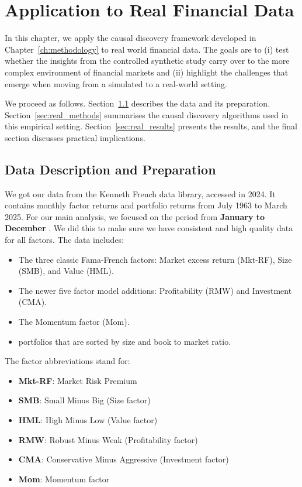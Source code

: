 \chapter{Application to Real Financial Data}
\label{ch:realdata}

In this chapter, we apply the causal discovery framework developed in Chapter~\ref{ch:methodology} to real world financial data. The goals are to (i) test whether the insights from the controlled synthetic study carry over to the more complex environment of financial markets and (ii) highlight the challenges that emerge when moving from a simulated to a real-world setting.

We proceed as follows. Section~\ref{sec:real_data_description} describes the data and its preparation. Section~\ref{sec:real_methods} summarises the causal discovery algorithms used in this empirical setting. Section~\ref{sec:real_results} presents the results, and the final section discusses practical implications.

\section{Data Description and Preparation}
\label{sec:real_data_description}

We got our data from the Kenneth French data library, accessed in 2024. It contains monthly factor returns and portfolio returns from July 1963 to March 2025. For our main analysis, we focused on the period from \textbf{January \RealStartDate{} to December \RealEndDate{}}. We did this to make sure we have consistent and high quality data for all factors. The data includes:
\begin{itemize}
    \item The three classic Fama-French factors: Market excess return (Mkt-RF), Size (SMB), and Value (HML).
    \item The newer five factor model additions: Profitability (RMW) and Investment (CMA).
    \item The Momentum factor (Mom).
    \item \RealNumPortfolios{} portfolios that are sorted by size and book to market ratio.
\end{itemize}

The factor abbreviations stand for:
\begin{itemize}
    \itemsep0em
    \item \textbf{Mkt-RF}: Market Risk Premium
    \item \textbf{SMB}: Small Minus Big (Size factor)
    \item \textbf{HML}: High Minus Low (Value factor)
    \item \textbf{RMW}: Robust Minus Weak (Profitability factor)
    \item \textbf{CMA}: Conservative Minus Aggressive (Investment factor)
    \item \textbf{Mom}: Momentum factor
\end{itemize}

